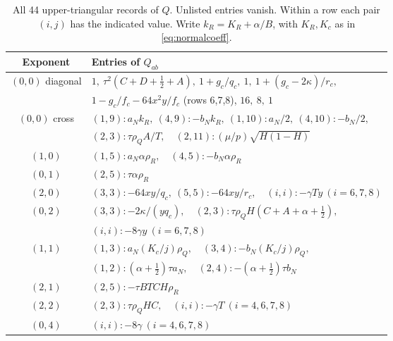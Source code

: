 \documentclass[10pt]{article}
\newcommand{\half}{\tfrac12}
\begin{document}
\begin{table}[t]
\centering
\caption{All 44 upper-triangular records of $Q$. Unlisted entries vanish.
Within a row each pair $(i,j)$ has the indicated value.
Write $k_R=K_R+\alpha/B$, with $K_R,K_c$ as in \eqref{eq:normalcoeff}.}
\label{tab:records}
\begin{tabular}{@{}cl@{}}
\toprule
Exponent & Entries of $Q_{ab}$\\ \midrule
$(0,0)$ diagonal&
$1,\ \tau^2(C+D+\half+A),\ 1+g_c/q_c,\ 1,\
1+(g_c-2\kappa)/r_c,$\\
&$1-g_c/f_c-64x^2y/f_c$ (rows 6,7,8), $16,\ 8,\ 1$\\
$(0,0)$ cross&
$(1,9):a_Nk_R,\ (4,9):-b_Nk_R,\ (1,10):a_N/2,\ (4,10):-b_N/2,$\\
&$(2,3):\tau\rho_QA/T,\quad(2,11):(\mu/p)\sqrt{H(1-H)}$\\
$(1,0)$&$(1,5):a_N\alpha\rho_R,\quad(4,5):-b_N\alpha\rho_R$\\
$(0,1)$&$(2,5):\tau\alpha\rho_R$\\
$(2,0)$&$(3,3):-64xy/q_c,\ (5,5):-64xy/r_c,\quad
(i,i):-\gamma Ty\ (i=6,7,8)$\\
$(0,2)$&$(3,3):-2\kappa/(yq_c),\quad
(2,3):\tau\rho_QH(C+A+\alpha+\half),$\\
&$(i,i):-8\gamma y\ (i=6,7,8)$\\
$(1,1)$&$(1,3):a_N(K_c/j)\rho_Q,\quad(3,4):-b_N(K_c/j)\rho_Q,$\\
&$(1,2):(\alpha+\half)\tau a_N,\quad
(2,4):-(\alpha+\half)\tau b_N$\\
$(2,1)$&$(2,5):-\tau BTCH\rho_R$\\
$(2,2)$&$(2,3):\tau\rho_QHC,\quad(i,i):-\gamma T\ (i=4,6,7,8)$\\
$(0,4)$&$(i,i):-8\gamma\ (i=4,6,7,8)$\\
\bottomrule
\end{tabular}
\end{table}
\end{document}
